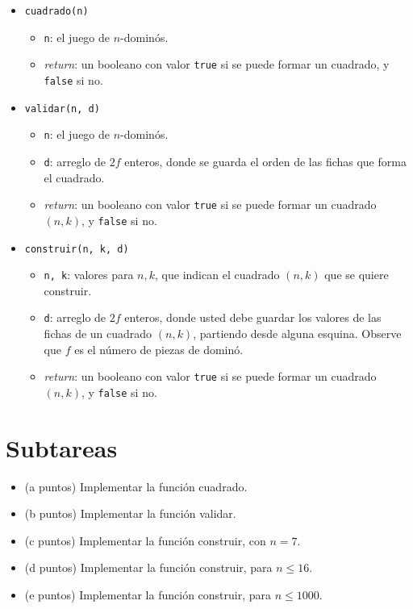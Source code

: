 \documentclass{article}
\begin{document}
\begin{itemize}
 \item \verb+cuadrado(n)+
 \begin{itemize}
  \item \verb+n+: el juego de $n$-dominós.
  \item \emph{return}: un booleano con valor \verb+true+ si se puede formar un cuadrado, y \verb+false+ si no.
 \end{itemize}
 \item \verb+validar(n, d)+
 \begin{itemize}
  \item \verb+n+: el juego de $n$-dominós.
  \item \verb+d+: arreglo de $2f$ enteros, donde se guarda el orden de las fichas que forma el cuadrado.
  \item \emph{return}: un booleano con valor \verb+true+ si se puede formar un cuadrado $(n,k)$, y \verb+false+ si no.
 \end{itemize}

 \item \verb+construir(n, k, d)+
 \begin{itemize}
  \item \verb+n, k+: valores para $n,k$, que indican el cuadrado $(n,k)$ que se quiere construir.
  \item \verb+d+: arreglo de $2f$ enteros, donde usted debe guardar los valores de las fichas de un cuadrado $(n,k)$, partiendo desde alguna esquina. Observe que $f$ es el número de piezas de dominó. %
  \item \emph{return}: un booleano con valor \verb+true+ si se puede formar un cuadrado $(n,k)$, y \verb+false+ si no.
 \end{itemize}
\end{itemize}

\section*{Subtareas}
\begin{itemize}
  \item (a puntos) Implementar la función cuadrado.
  \item (b puntos) Implementar la función validar.
  \item (c puntos) Implementar la función construir, con $n=7$.
  \item (d puntos) Implementar la función construir, para $n \le 16$.
  \item (e puntos) Implementar la función construir, para $n \le 1000$.
\end{itemize}


\end{document}
